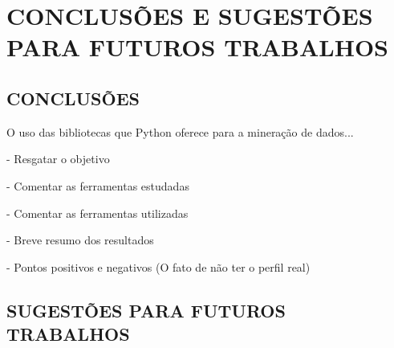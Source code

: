 
\chapter{CONCLUSÕES E SUGESTÕES PARA FUTUROS TRABALHOS}\label{ch:conclusao}
\section{CONCLUSÕES} 
O uso das bibliotecas que Python oferece para a mineração de dados...

- Resgatar o objetivo

- Comentar as ferramentas estudadas

- Comentar as ferramentas utilizadas

- Breve resumo dos resultados

- Pontos positivos e negativos (O fato de não ter o perfil real)


\section{SUGESTÕES PARA FUTUROS TRABALHOS}

%

